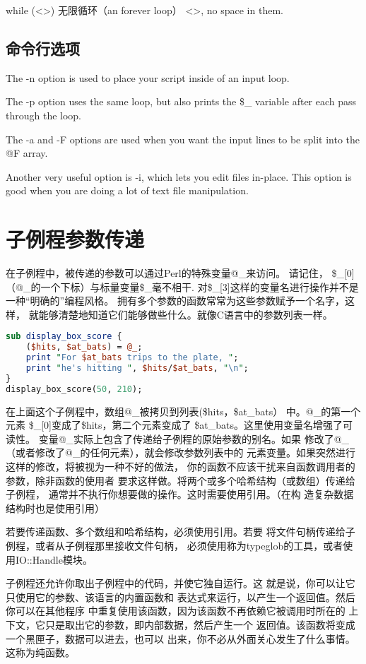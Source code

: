 \documentclass[a4paper,11pt]{book}
\begin{document}
while (<>) {} 无限循环（an forever loop）
<>, no space in them.

\subsection{命令行选项}
 The -n option is used to place your script inside of an input loop.
 
 The -p option uses the same loop, but also prints the \$_ variable
 after each pass through the loop.
 
 The -a and -F options are used when you want the input lines to be split
 into the @F array. 

Another very useful option is -i, which lets you edit files in-place. 
This option is good when you are doing a lot of text file manipulation. 

\section{子例程参数传递}
在子例程中，被传递的参数可以通过Perl的特殊变量@_来访问。
请记住， \$_[0]（@_的一个下标）与标量变量\$_毫不相干.
对\$_[3]这样的变量名进行操作并不是一种“明确的”编程风格。
拥有多个参数的函数常常为这些参数赋予一个名字，这样，
就能够清楚地知道它们能够做些什么。就像C语言中的参数列表一样。

\begin{lstlisting}[language=perl]
sub display_box_score {
    ($hits, $at_bats) = @_;
    print "For $at_bats trips to the plate, ";
    print "he's hitting ", $hits/$at_bats, "\n";
}
display_box_score(50, 210);
\end{lstlisting}
在上面这个子例程中，数组@_被拷贝到列表(\$hits，\$at_bats）
中。@_的第一个元素 \$_[0]变成了\$hits，第二个元素变成了
\$at_bats。这里使用变量名增强了可读性。
变量@_实际上包含了传递给子例程的原始参数的别名。如果
修改了@_（或者修改了@_的任何元素），就会修改参数列表中的
元素变量。如果突然进行这样的修改，将被视为一种不好的做法，
你的函数不应该干扰来自函数调用者的参数，除非函数的使用者
要求这样做。将两个或多个哈希结构（或数组）传递给子例程，
通常并不执行你想要做的操作。这时需要使用引用。（在构
造复杂数据结构时也是使用引用）


若要传递函数、多个数组和哈希结构，必须使用引用。若要
将文件句柄传递给子例程，或者从子例程那里接收文件句柄，
必须使用称为typeglob的工具，或者使用IO::Handle模块。

子例程还允许你取出子例程中的代码，并使它独自运行。这
就是说，你可以让它只使用它的参数、该语言的内置函数和
表达式来运行，以产生一个返回值。然后你可以在其他程序
中重复使用该函数，因为该函数不再依赖它被调用时所在的
上下文，它只是取出它的参数，即内部数据，然后产生一个
返回值。该函数将变成一个黑匣子，数据可以进去，也可以
出来，你不必从外面关心发生了什么事情。这称为纯函数。
\end{document}
